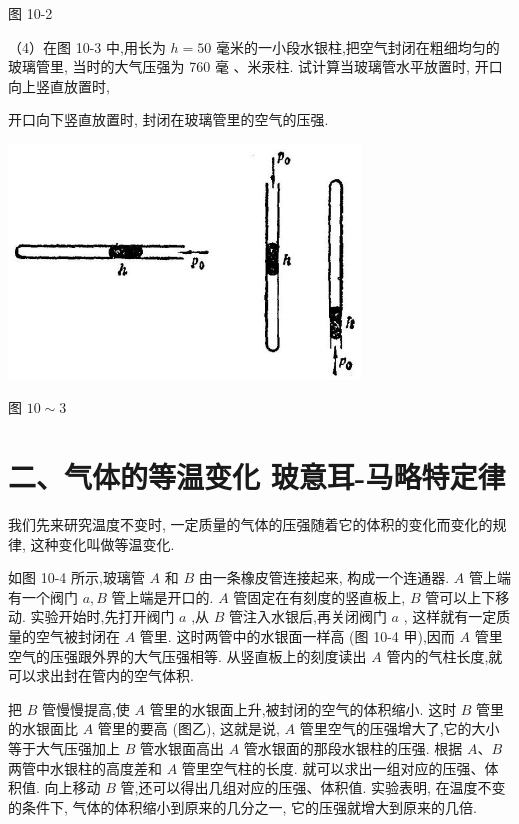 \documentclass[10pt]{article}
\begin{document}
图 10-2

（4）在图 10-3 中,用长为 \(h = {50}\) 毫米的一小段水银柱,把空气封闭在粗细均匀的玻璃管里, 当时的大气压强为 760 毫 、米汞柱. 试计算当玻璃管水平放置时, 开口向上竖直放置时,

开口向下竖直放置时, 封闭在玻璃管里的空气的压强.

\begin{center}
\includegraphics[max width=0.7\textwidth]{images/01912d55-147c-70aa-b0e0-1782a122f948_282_669467.jpg}
\end{center}

图 \({10} \sim 3\)

\section*{二、气体的等温变化 玻意耳-马略特定律}

我们先来研究温度不变时, 一定质量的气体的压强随着它的体积的变化而变化的规律, 这种变化叫做等温变化.

如图 10-4 所示,玻璃管 \(A\) 和 \(B\) 由一条橡皮管连接起来, 构成一个连通器. \(A\) 管上端有一个阀门 \(a,B\) 管上端是开口的. \(A\) 管固定在有刻度的竖直板上, \(B\) 管可以上下移动. 实验开始时,先打开阀门 \(a\) ,从 \(B\) 管注入水银后,再关闭阀门 \(a\) , 这样就有一定质量的空气被封闭在 \(A\) 管里. 这时两管中的水银面一样高 (图 10-4 甲),因而 \(A\) 管里空气的压强跟外界的大气压强相等. 从竖直板上的刻度读出 \(A\) 管内的气柱长度,就可以求出封在管内的空气体积.

把 \(B\) 管慢慢提高,使 \(A\) 管里的水银面上升,被封闭的空气的体积缩小. 这时 \(B\) 管里的水银面比 \(A\) 管里的要高 (图乙), 这就是说, \(A\) 管里空气的压强增大了,它的大小等于大气压强加上 \(B\) 管水银面高出 \(A\) 管水银面的那段水银柱的压强. 根据 \(A\text{、}B\) 两管中水银柱的高度差和 \(A\) 管里空气柱的长度. 就可以求出一组对应的压强、体积值. 向上移动 \(B\) 管,还可以得出几组对应的压强、体积值. 实验表明, 在温度不变的条件下, 气体的体积缩小到原来的几分之一, 它的压强就增大到原来的几倍.
\end{document}
